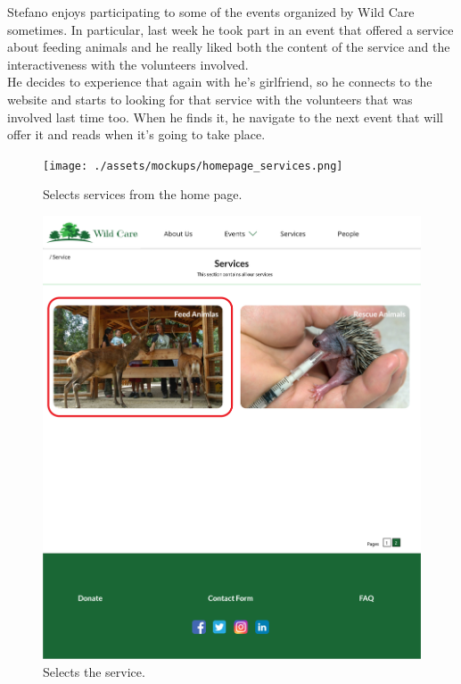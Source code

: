 Stefano enjoys participating to some of the events organized by Wild Care sometimes. In particular, last week he took part in an event that offered a service about feeding animals and he really liked both the content of the service and the interactiveness with the volunteers involved.\\
He decides to experience that again with he's girlfriend, so he connects to the website and starts to looking for that service with the volunteers that was involved last time too. When he finds it, he navigate to the next event that will offer it and reads when it's going to take place.

	\begin{figure}[h!]
		\centering
		\begin{minipage}[b]{1\textwidth}
    			\texttt{[image: ./assets/mockups/homepage\_services.png]}
			\caption{Selects services from the home page.}
		\end{minipage}
	\end{figure}

	\begin{figure}[h!]
		\centering
		\begin{minipage}[b]{1\textwidth}
    			\includegraphics[width=\textwidth]{./assets/mockups/services_servicedetails.png}
			\caption{Selects the service.}
		\end{minipage}
	\end{figure}

